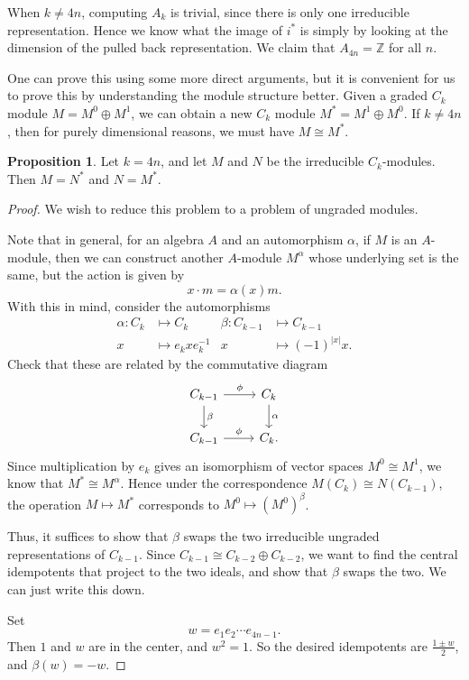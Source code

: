 \documentclass{shortart}
\theoremstyle{definition}
\newtheorem*{prop}{Proposition}
\newcommand\Z{\mathbb{Z}}
\begin{document}
When $k \not= 4n$, computing $A_k$ is trivial, since there is only one irreducible representation. Hence we know what the image of $i^*$ is simply by looking at the dimension of the pulled back representation. We claim that $A_{4n} = \Z$ for all $n$.

One can prove this using some more direct arguments, but it is convenient for us to prove this by understanding the module structure better. Given a graded $C_k$ module $M = M^0 \oplus M^1$, we can obtain a new $C_k$ module $M^* = M^1 \oplus M^0$. If $k \not= 4n$, then for purely dimensional reasons, we must have $M \cong M^*$.
\begin{prop}
  Let $k = 4n$, and let $M$ and $N$ be the irreducible $C_k$-modules. Then $M = N^*$ and $N = M^*$.
\end{prop}

\begin{proof}
  We wish to reduce this problem to a problem of ungraded modules.

  Note that in general, for an algebra $A$ and an automorphism $\alpha$, if $M$ is an $A$-module, then we can construct another $A$-module $M^\alpha$ whose underlying set is the same, but the action is given by
  \[
    x \cdot m = \alpha(x)m.
  \]
  With this in mind, consider the automorphisms
  \begin{align*}
    \alpha: C_k &\mapsto C_k & \beta: C_{k - 1} &\mapsto C_{k - 1}\\
    x &\mapsto e_k x e_k^{-1} & x &\mapsto (-1)^{|x|} x.
  \end{align*}
  Check that these are related by the commutative diagram
  \[
    \begin{tikzcd}
      C_{k - 1} \ar[r, "\phi"] \ar[d, "\beta"] & C_k \ar[d, "\alpha"]\\
      C_{k - 1} \ar[r, "\phi"] & C_k.
    \end{tikzcd}
  \]
  Since multiplication by $e_k$ gives an isomorphism of vector spaces $M^0 \cong M^1$, we know that $M^* \cong M^{\alpha}$. Hence under the correspondence $M(C_k) \cong N(C_{k - 1})$, the operation $M \mapsto M^*$ corresponds to $M^0 \mapsto (M^0)^{\beta}$.

  Thus, it suffices to show that $\beta$ swaps the two irreducible ungraded representations of $C_{k - 1}$. Since $C_{k - 1} \cong C_{k - 2} \oplus C_{k - 2}$, we want to find the central idempotents that project to the two ideals, and show that $\beta$ swaps the two. We can just write this down.

  Set
  \[
    w = e_1 e_2 \cdots e_{4n - 1}.
  \]
  Then $1$ and $w$ are in the center, and $w^2 = 1$. So the desired idempotents are $\frac{1 \pm w}{2}$, and $\beta(w) = -w$.
\end{proof}
\end{document}
